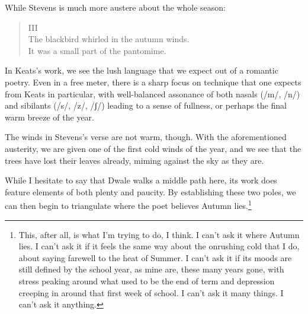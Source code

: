 \documentclass[12pt,oneside]{memoir}
\begin{document}
While Stevens is much more austere about the whole season:

\begin{verse}
III \\
The blackbird whirled in the autumn winds. \\
It was a small part of the pantomime.

\parencite{blackbird}
\end{verse}

In Keats's work, we see the lush language that we expect out of a romantic poetry. Even in a free meter, there is a sharp focus on technique that one expects from Keats in particular, with well-balanced assonance of both nasals (/m/, /n/) and sibilants (/s/, /z/, /ʃ/) leading to a sense of fullness, or perhaps the final warm breeze of the year.

The winds in Stevens's verse are not warm, though. With the aforementioned austerity, we are given one of the first cold winds of the year, and we see that the trees have lost their leaves already, miming against the sky as they are.

While I hesitate to say that Dwale walks a middle path here, its work does feature elements of both plenty and paucity. By establishing these two poles, we can then begin to triangulate where the poet believes Autumn lies.\footnote{This, after all, is what I'm trying to do, I think. I can't ask it where Autumn lies. I can't ask it if it feels the same way about the onrushing cold that I do, about saying farewell to the heat of Summer. I can't ask it if its moods are still defined by the school year, as mine are, these many years gone, with stress peaking around what used to be the end of term and depression creeping in around that first week of school. I can't ask it many things. I can't ask it anything.}
\end{document}
